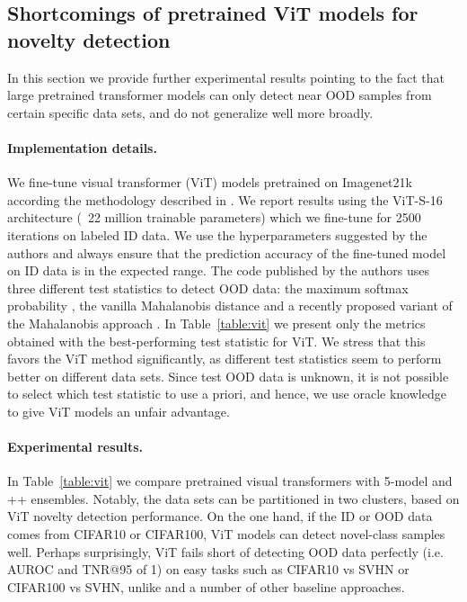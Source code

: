 \subsection{Shortcomings of pretrained ViT models for novelty detection}
\label{sec:appendix_vit}

In this section we provide further experimental results pointing to the fact
that large pretrained transformer models \citep{fort2021} can only detect near
OOD samples from certain specific data sets, and do not generalize well more
broadly.

\paragraph{Implementation details.} We fine-tune visual transformer (ViT) models
pretrained on Imagenet21k according the methodology described in
\citet{fort2021}. We report results using the ViT-S-16 architecture (~22 million
trainable parameters) which we fine-tune for 2500 iterations on labeled ID data.
We use the hyperparameters suggested by the authors and always ensure that the
prediction accuracy of the fine-tuned model on ID data is in the expected range.
The code published by the authors uses three different test statistics to detect
OOD data: the maximum softmax probability \citep{Hendrycks2017}, the vanilla
Mahalanobis distance \citep{mahalanobis} and a recently proposed variant of the
Mahalanobis approach \citep{Ren2021}. In Table~\ref{table:vit} we present only
the metrics obtained with the best-performing test statistic for ViT. We stress
that this favors the ViT method significantly, as different test statistics seem
to perform better on different data sets. Since test OOD data is unknown, it is
not possible to select which test statistic to use a priori, and hence, we use
oracle knowledge to give ViT models an unfair advantage.

\paragraph{Experimental results.} In Table~\ref{table:vit} we compare pretrained
visual transformers with 5-model  and ++ ensembles.  Notably,
the data sets can be partitioned in two clusters, based on ViT novelty detection
performance. On the one hand, if the ID or OOD data comes from CIFAR10 or
CIFAR100, ViT models can detect novel-class samples well. Perhaps surprisingly,
ViT fails short of detecting OOD data perfectly (i.e. AUROC and TNR@95 of 1) on
easy tasks such as CIFAR10 vs SVHN or CIFAR100 vs SVHN, unlike  and a
number of other baseline approaches.


